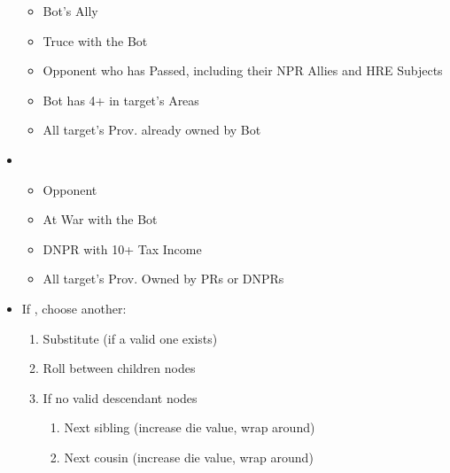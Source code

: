 \documentclass[10pt]{article}
\begin{document}
\begin{itemize}
\begin{itemize}
		\item Bot's Ally
		\item Truce with the Bot
		\item Opponent who has Passed, including their NPR Allies and HRE Subjects 
		\item Bot has 4+ \influence in target's Areas
		\item All target's Prov. already owned by Bot
	\end{itemize}
	\item {}
	\begin{itemize}
		\item Opponent
		\item At War with the Bot
		\item DNPR with 10+ Tax Income
		\item All target's Prov. Owned by PRs or DNPRs
	\end{itemize}
	\item If , choose another:
	\begin{enumerate}
		\item Substitute (if a valid one exists)
		\item Roll between children nodes
		\item If no valid descendant nodes
		\begin{enumerate}[label=\arabic*.]
			\item Next sibling (increase die value, wrap around)
			\item Next cousin (increase die value, wrap around)
		\end{enumerate}
	\end{enumerate}
\end{itemize}
\end{document}
